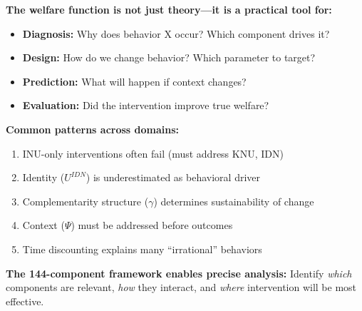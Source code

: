 \begin{tcolorbox}[colback=gray!5!white, colframe=gray!75!black, title=Section 10.9 Summary]
\textbf{The welfare function is not just theory---it is a practical tool for:}
\begin{itemize}
\item \textbf{Diagnosis:} Why does behavior X occur? Which component drives it?
\item \textbf{Design:} How do we change behavior? Which parameter to target?
\item \textbf{Prediction:} What will happen if context changes?
\item \textbf{Evaluation:} Did the intervention improve true welfare?
\end{itemize}

\textbf{Common patterns across domains:}
\begin{enumerate}
\item INU-only interventions often fail (must address KNU, IDN)
\item Identity ($U^{IDN}$) is underestimated as behavioral driver
\item Complementarity structure ($\gamma$) determines sustainability of change
\item Context ($\Psi$) must be addressed before outcomes
\item Time discounting explains many ``irrational'' behaviors
\end{enumerate}

\textbf{The 144-component framework enables precise analysis:}
Identify \emph{which} components are relevant, \emph{how} they interact,
and \emph{where} intervention will be most effective.
\end{tcolorbox}

